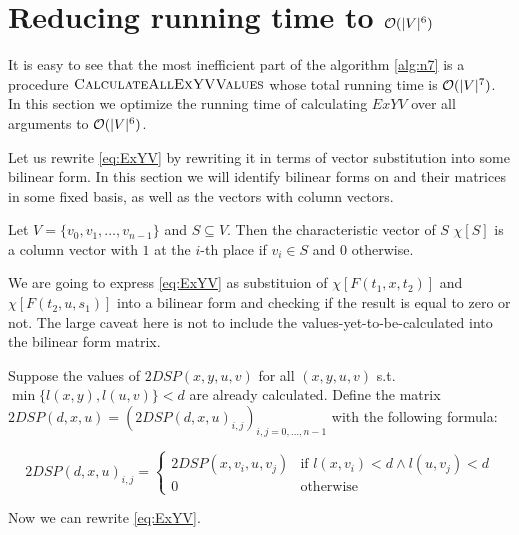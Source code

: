\section{Reducing running time to $\mathcal{O}(|V|^6)$}

It is easy to see that the most inefficient part of the algorithm \ref{alg:n7} is a procedure $\textsc{CalculateAllExYVValues}$ whose total running time is $\mathcal{O}(|V|^7)$. In this section we optimize the running time of calculating $ExYV$ over all arguments to $\mathcal{O}(|V|^6)$.

Let us rewrite \eqref{eq:ExYV} by rewriting it in terms of vector substitution into some bilinear form. In this section we will identify bilinear forms on and their matrices in some fixed basis, as well as the vectors with column vectors.

\begin{definition}
Let $V = \{v_0, v_1, \ldots, v_{n-1}\}$ and $S \subseteq V$. Then the characteristic vector of $S$ $\chi[S]$ is a column vector with $1$ at the $i$-th place if $v_i \in S$ and $0$ otherwise.
\end{definition}

We are going to express \eqref{eq:ExYV} as substituion of $\chi[F(t_1, x, t_2)]$ and $\chi[F(t_2, u, s_1)]$ into a bilinear form and checking if the result is equal to zero or not. The large caveat here is not to include the values-yet-to-be-calculated into the bilinear form matrix. 

\begin{definition}
Suppose the values of $2DSP(x, y, u, v)$ for all $(x, y, u, v)$ s.t. $\min\{l(x, y), l(u, v)\} < d$ are already calculated. Define the matrix $2DSP(d,x,u) = (2DSP(d,x,u)_{i,j})_{i,j=0,\ldots,n-1}$ with the following formula:

\begin{equation}
2DSP(d,x,u)_{i,j} = \begin{cases}
    2DSP(x,v_i,u,v_j) & \text{if } l(x,v_i) < d \wedge l(u,v_j) < d \\
    0                 & \text{otherwise}
\end{cases}
\end{equation}

\end{definition}

Now we can rewrite \eqref{eq:ExYV}.

